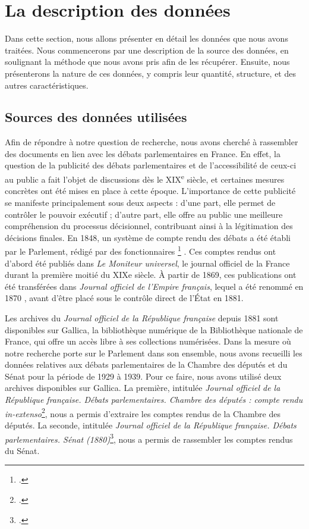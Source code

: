 \documentclass[a4paper,twoside,12pt]{book}
\begin{document}
\section{La description des données}

Dans cette section, nous allons présenter en détail les données que nous avons traitées. Nous commencerons par une description de la source des données, en soulignant la méthode que nous avons pris afin de les récupérer. Ensuite, nous présenterons la nature de ces données, y compris leur quantité, structure, et des autres caractéristiques.

\subsection{Sources des données utilisées}

Afin de répondre à notre question de recherche, nous avons cherché à rassembler des documents en lien avec les débats parlementaires en France. En effet, la question de la publicité des débats parlementaires et de l'accessibilité de ceux-ci au public a fait l'objet de discussions dès le XIX\textsuperscript{e} siècle, et certaines mesures concrètes ont été mises en place à cette époque. L'importance de cette publicité se manifeste principalement sous deux aspects : d'une part, elle permet de contrôler le pouvoir exécutif ; d'autre part, elle offre au public une meilleure compréhension du processus décisionnel, contribuant ainsi à la légitimation des décisions finales. En 1848, un système de compte rendu des débats a été établi par le Parlement, rédigé par des fonctionnaires \footcite[p. 19-20]{morel2024} . Ces comptes rendus ont d'abord été publiés dans \textit{Le Moniteur universel}, le journal officiel de la France durant la première moitié du XIXe siècle. À partir de 1869, ces publications ont été transférées dans \textit{Journal officiel de l'Empire français}, lequel a été renommé en 1870 , avant d'être placé sous le contrôle direct de l'État en 1881.

Les archives du \textit{Journal officiel de la République française} depuis 1881 sont disponibles sur Gallica, la bibliothèque numérique de la Bibliothèque nationale de France, qui offre un accès libre à ses collections numérisées. Dans la mesure où notre recherche porte sur le Parlement dans son ensemble, nous avons recueilli les données relatives aux débats parlementaires de la Chambre des députés et du Sénat pour la période de 1929 à 1939. Pour ce faire, nous avons utilisé deux archives disponibles sur Gallica. La première, intitulée \textit{Journal officiel de la République française. Débats parlementaires. Chambre des députés : compte rendu in-extenso}\footcite{zotero-722}, nous a permis d'extraire les comptes rendus de la Chambre des députés. La seconde, intitulée \textit{Journal officiel de la République française. Débats parlementaires. Sénat (1880)}\footcite{zotero-724}, nous a permis de rassembler les comptes rendus du Sénat.
\end{document}
